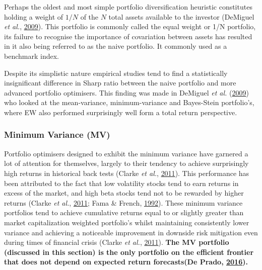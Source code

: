 \documentclass[11pt,preprint, authoryear]{elsarticle}
\numberwithin{equation}{section}
\numberwithin{figure}{section}
\numberwithin{table}{section}
\begin{document}
Perhaps the oldest and most simple portfolio diversification heuristic
constitutes holding a weight of \(1/N\) of the \(N\) total assets
available to the investor (DeMiguel \emph{et al.},
\protect\hyperlink{ref-demiguel2009}{2009}). This portfolio is commonly
called the equal weight or 1/N portfolio, its failure to recognise the
importance of covariation between assets has resulted in it also being
referred to as the naive portfolio. It commonly used as a benchmark
index.

Despite its simplistic nature empirical studies tend to find a
statistically insignificant difference in Sharp ratio between the naive
portfolio and more advanced portfolio optimisers. This finding was made
in DeMiguel \emph{et al.} (\protect\hyperlink{ref-demiguel2009}{2009})
who looked at the mean-variance, minimum-variance and Bayes-Stein
portfolio's, where EW also performed surprisingly well form a total
return perspective.

\hypertarget{minimum-variance-mv}{%
\subsubsection{Minimum Variance (MV)}\label{minimum-variance-mv}}

Portfolio optimisers designed to exhibit the minimum variance have
garnered a lot of attention for themselves, largely to their tendency to
achieve surprisingly high returns in historical back tests (Clarke
\emph{et al.}, \protect\hyperlink{ref-clarke2011}{2011}). This
performance has been attributed to the fact that low volatility stocks
tend to earn returns in excess of the market, and high beta stocks tend
not to be rewarded by higher returns (Clarke \emph{et al.},
\protect\hyperlink{ref-clarke2011}{2011}; Fama \& French,
\protect\hyperlink{ref-fama1992}{1992}). These minimum variance
portfolios tend to achieve cumulative returns equal to or slightly
greater than market capitalization weighted portfolio's whilst
maintaining consistently lower variance and achieving a noticeable
improvement in downside risk mitigation even during times of financial
crisis (Clarke \emph{et al.}, \protect\hyperlink{ref-clarke2011}{2011}).
\textbf{The MV portfolio (discussed in this section) is the only
portfolio on the efficient frontier that does not depend on expected
return forecasts(De Prado, \protect\hyperlink{ref-lopez}{2016}).}
\end{document}
